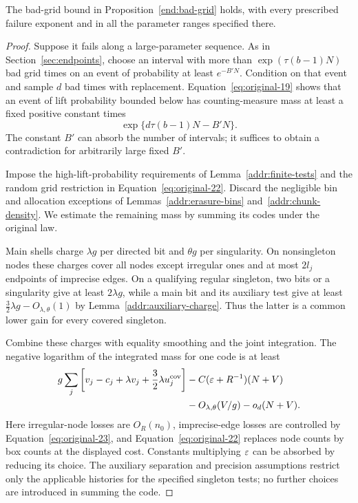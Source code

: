 \begin{proposition}
\label{addr:bad-grid-proof}
The bad-grid bound in Proposition~\ref{end:bad-grid} holds, with
every prescribed failure exponent and in all the parameter ranges
specified there.
\end{proposition}

\begin{proof}
Suppose it fails along a large-parameter sequence.  As in
Section~\ref{sec:endpoints}, choose an interval with more than
$\exp(\tau(b-1)N)$ bad grid times on an event of probability
at least $e^{-B'N}$.  Condition on that event and sample $d$
bad times with replacement.  Equation~\eqref{eq:original-19}
shows that an event of lift probability bounded below has
counting-measure mass at least a fixed positive constant times
\begin{equation}\label{addr:counting-lower}
                      \exp\{d\tau(b-1)N-B'N\}.
\end{equation}
The constant $B'$ can absorb the number of intervals; it suffices
to obtain a contradiction for arbitrarily large fixed $B'$.

Impose the high-lift-probability requirements of
Lemma~\ref{addr:finite-tests} and the random grid restriction in
Equation~\eqref{eq:original-22}.  Discard the negligible bin and
allocation exceptions of Lemmas~\ref{addr:erasure-bins}
and~\ref{addr:chunk-density}.  We estimate the remaining mass
by summing its codes under the original law.

Main shells charge $\lambda g$ per directed bit and $\theta g$
per singularity.  On nonsingleton nodes these charges cover all
nodes except irregular ones and at most $2l_j$ endpoints of
imprecise edges.  On a qualifying regular singleton, two bits
or a singularity give at least $2\lambda g$, while a main bit
and its auxiliary test give at least
$\frac32\lambda g-O_{\lambda,\theta}(1)$ by
Lemma~\ref{addr:auxiliary-charge}.  Thus the latter is a common
lower gain for every covered singleton.

Combine these charges with equality smoothing and the joint
integration.  The negative logarithm of the integrated mass for
one code is at least
\begin{equation}\label{addr:charge}
\begin{split}
 g\sum_j\left[
       v_j-c_j+\lambda v_j+\frac32\lambda u_j^{\rm cov}
            \right]
 &-C(\varepsilon+R^{-1})(N+V)\\
 &-O_{\lambda,\theta}(V/g)-o_d(N+V).
\end{split}
\end{equation}
Here irregular-node losses are $O_R(n_0)$, imprecise-edge losses
are controlled by Equation~\eqref{eq:original-23}, and
Equation~\eqref{eq:original-22} replaces node counts by box
counts at the displayed cost.  Constants multiplying $\varepsilon$
can be absorbed by reducing its choice.  The auxiliary
separation and precision assumptions restrict only the applicable
histories for the specified singleton tests; no further choices
are introduced in summing the code.


\end{proof}
